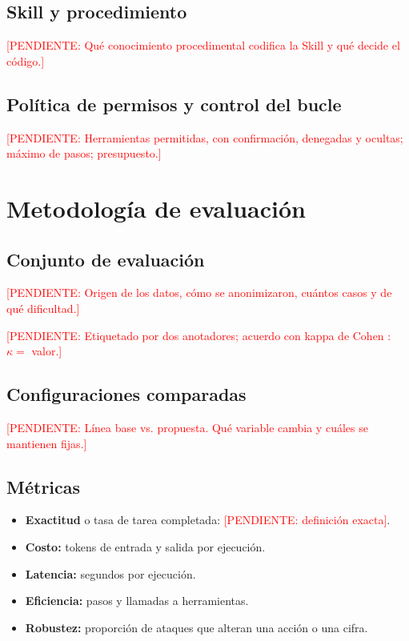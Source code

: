 \documentclass[10pt,twocolumn,a4paper]{article}
\newcommand{\todo}[1]{\textcolor{red}{[PENDIENTE: #1]}}
\begin{document}
\subsection{Skill y procedimiento}
\todo{Qué conocimiento procedimental codifica la Skill y qué decide el código.}

\subsection{Política de permisos y control del bucle}
\todo{Herramientas permitidas, con confirmación, denegadas y ocultas; máximo de pasos; presupuesto.}

\section{Metodología de evaluación}
\subsection{Conjunto de evaluación}
\todo{Origen de los datos, cómo se anonimizaron, cuántos casos y de qué dificultad.}

\todo{Etiquetado por dos anotadores; acuerdo con kappa de Cohen \cite{cohen1960kappa}: $\kappa = $ valor.}

\subsection{Configuraciones comparadas}
\todo{Línea base vs. propuesta. Qué variable cambia y cuáles se mantienen fijas.}

\subsection{Métricas}
\begin{itemize}
  \item \textbf{Exactitud} o tasa de tarea completada: \todo{definición exacta}.
  \item \textbf{Costo:} tokens de entrada y salida por ejecución.
  \item \textbf{Latencia:} segundos por ejecución.
  \item \textbf{Eficiencia:} pasos y llamadas a herramientas.
  \item \textbf{Robustez:} proporción de ataques que alteran una acción o una cifra.
\end{itemize}
\end{document}
